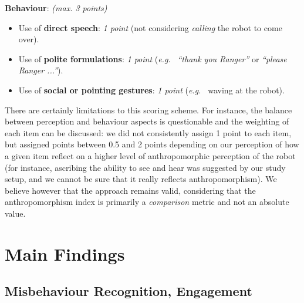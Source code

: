 \documentclass{sig-alternate}
\newcommand{\eg}{{\textit{e.g.~}}}
\begin{document}
\textbf{Behaviour}: \textit{(max. 3 points)}
\begin{itemize}
    \item Use of \textbf{direct speech}: \textit{1 point} (not considering
        \textit{calling} the robot to come over).

    \item Use of \textbf{polite formulations}: \textit{1 point} (\eg
        \textit{``thank you Ranger''} or \textit{``please Ranger ...''}).

    \item Use of \textbf{social or pointing gestures}: \textit{1 point} (\eg
        waving at the robot).

\end{itemize}

There are certainly limitations to this scoring scheme. For instance, the
balance between perception and behaviour aspects is questionable and the
weighting of each item can be discussed: we did not consistently assign 1 point
to each item, but assigned points between 0.5 and 2 points depending on our
perception of how a given item reflect on a higher level of anthropomorphic
perception of the robot (for instance, ascribing the ability to see and hear was
suggested by our study setup, and we cannot be sure that it really reflects
anthropomorphism). We believe however that the approach remains valid,
considering that the anthropomorphism index is primarily a \emph{comparison}
metric and not an absolute value.

\section{Main Findings}

\subsection{Misbehaviour Recognition, Engagement}

\end{document}
